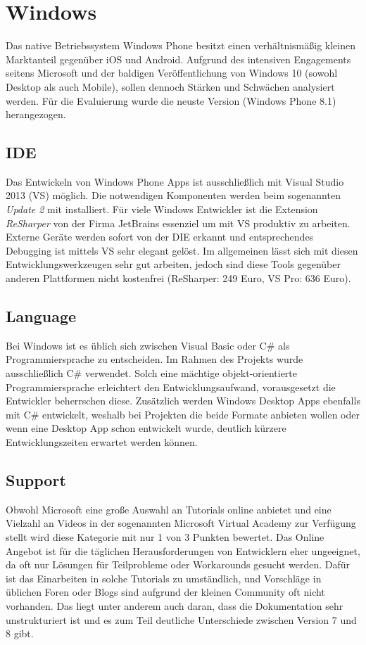 \section{Windows}

Das native Betriebssystem Windows Phone besitzt einen verhältnismäßig kleinen Marktanteil gegenüber iOS und Android. Aufgrund des intensiven Engagements seitens Microsoft und der baldigen Veröffentlichung von Windows 10 (sowohl Desktop als auch Mobile), sollen dennoch Stärken und Schwächen analysiert werden. Für die Evaluierung wurde die neuste Version (Windows Phone 8.1) herangezogen.

\subsection{IDE}

Das Entwickeln von Windows Phone Apps ist ausschließlich mit Visual Studio 2013 (VS) möglich. Die notwendigen Komponenten werden beim sogenannten \textit{Update 2} mit installiert. Für viele Windows Entwickler ist die Extension \textit{ReSharper} von der Firma JetBrains essenziel um mit VS produktiv zu arbeiten. Externe Geräte werden sofort von der DIE erkannt und entsprechendes Debugging ist mittels VS sehr elegant gelöst. Im allgemeinen lässt sich mit diesen Entwicklungswerkzeugen sehr gut arbeiten, jedoch sind diese Tools gegenüber anderen Plattformen nicht kostenfrei (ReSharper: 249 Euro, VS Pro: 636 Euro).

\subsection{Language}

Bei Windows ist es üblich sich zwischen Visual Basic oder C\# als Programmiersprache zu entscheiden. Im Rahmen des Projekts wurde ausschließlich C\# verwendet. Solch eine mächtige objekt-orientierte Programmiersprache erleichtert den Entwicklungsaufwand, vorausgesetzt die Entwickler beherrschen diese. Zusätzlich werden Windows Desktop Apps ebenfalls mit C\# entwickelt, weshalb bei Projekten die beide Formate anbieten wollen oder wenn eine Desktop App schon entwickelt wurde, deutlich kürzere Entwicklungszeiten erwartet werden können.

\subsection{Support}

Obwohl Microsoft eine große Auswahl an Tutorials online anbietet und eine Vielzahl an Videos in der sogenannten Microsoft Virtual Academy zur Verfügung stellt wird diese Kategorie mit nur 1 von 3 Punkten bewertet. Das Online Angebot ist für die täglichen Herausforderungen von Entwicklern eher ungeeignet, da oft nur Lösungen für Teilprobleme oder Workarounds gesucht werden. Dafür ist das Einarbeiten in solche Tutorials zu umständlich, und Vorschläge in üblichen Foren oder Blogs sind aufgrund der kleinen Community oft nicht vorhanden. Das liegt unter anderem auch daran, dass die Dokumentation sehr unstrukturiert ist und es zum Teil deutliche Unterschiede zwischen Version 7 und 8 gibt.

